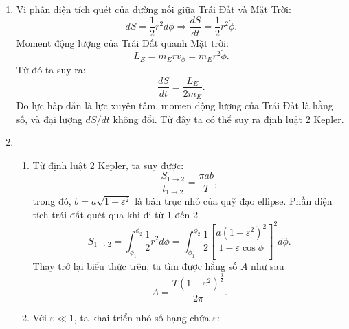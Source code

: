 \begin{enumerate}[label=\textbf{\arabic*,}] 
        \item
        Vi phân diện tích quét của đường nối giữa Trái Đất và Mặt Trời:
        \begin{equation} \label{eq1_Earth_eccentricity}
            dS = \frac{1}{2} r^2 d\phi \Rightarrow\frac{dS}{dt} = \frac{1}{2} r^2 \Dot{\phi}.
        \end{equation}
        Moment động lượng của Trái Đất quanh Mặt trời:
        \begin{equation} \label{eq2_Earth_eccentricity}
            L_E = m_E r v_\phi = m_E r^2 \Dot{\phi} .
        \end{equation}
        Từ đó ta suy ra:
        \begin{equation} \label{eq3_Earth_eccentricity}
            \frac{dS}{dt} = \frac{L_E}{2m_E}.
        \end{equation}
        Do lực hấp dẫn là lực xuyên tâm, momen động lượng của Trái Đất là hằng số, và đại lượng \(dS/dt\) không đổi. Từ đây ta có thể suy ra định luật 2 Kepler.
        \item 
        \begin{enumerate}[label=\textbf{\alph*,}]\itemsep0em
        \item Từ định luật 2 Kepler, ta suy được: 
        \begin{equation} \label{eq4_Earth_eccentricity}
            \frac{S_{1 \rightarrow 2}}{t_{1 \rightarrow 2}} = \frac{\pi ab}{T},
        \end{equation}
        trong đó, $b=a \sqrt{1-\varepsilon^2}$ là bán trục nhỏ của quỹ đạo ellipse. Phần diện tích trái đất quét qua khi đi từ 1 đến 2
        \begin{equation} \label{eq5_Earth_eccentricity}
            S_{1 \rightarrow 2} = \int_{\phi_1}^{\phi_2} \frac{1}{2} r^2 d\phi = \int_{\phi_1}^{\phi_2} \frac{1}{2} \left[ \dfrac{a \left( 1 - \varepsilon^2 \right)^2}{1 - \varepsilon \cos \phi} \right]^2 d \phi.
        \end{equation}
        Thay trở lại biểu thức trên, ta tìm được hằng số $A$ như sau
        \begin{equation} \label{eq6_Earth_eccentricity}
            A = \frac{T (1 - \varepsilon^2)^{\frac{3}{2}}}{2 \pi}.
        \end{equation}
        \item Với $\varepsilon \ll 1$, ta khai triển nhỏ số hạng chứa $\varepsilon$:
        \begin{equation} \label{eq7_Earth_eccentricity}

\end{equation}
\end{enumerate}
\end{enumerate}
